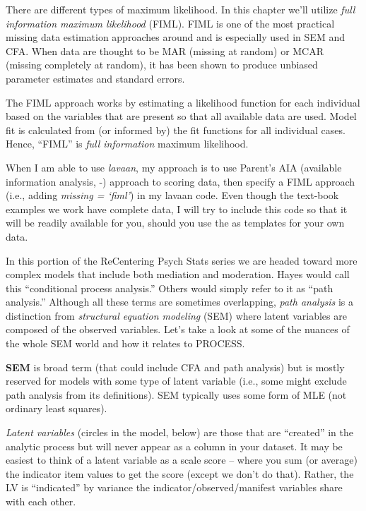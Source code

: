 \documentclass[
  11pt,
]{book}
\begin{document}
There are different types of maximum likelihood. In this chapter we'll utilize \emph{full information maximum likelihood} (FIML). FIML is one of the most practical missing data estimation approaches around and is especially used in SEM and CFA. When data are thought to be MAR (missing at random) or MCAR (missing completely at random), it has been shown to produce unbiased parameter estimates and standard errors.

The FIML approach works by estimating a likelihood function for each individual based on the variables that are present so that all available data are used. Model fit is calculated from (or informed by) the fit functions for all individual cases. Hence, ``FIML'' is \emph{full information} maximum likelihood.

When I am able to use \emph{lavaan}, my approach is to use Parent's AIA (available information analysis, -\citet{parent_handling_2013}) approach to scoring data, then specify a FIML approach (i.e., adding \emph{missing = `fiml'}) in my lavaan code. Even though the text-book examples we work have complete data, I will try to include this code so that it will be readily available for you, should you use the as templates for your own data.

In this portion of the ReCentering Psych Stats series we are headed toward more complex models that include both mediation and moderation. Hayes \citep{hayes_introduction_2018} would call this ``conditional process analysis.'' Others would simply refer to it as ``path analysis.'' Although all these terms are sometimes overlapping, \emph{path analysis} is a distinction from \emph{structural equation modeling} (SEM) where latent variables are composed of the observed variables. Let's take a look at some of the nuances of the whole SEM world and how it relates to PROCESS.

\textbf{SEM} is broad term (that could include CFA and path analysis) but is mostly reserved for models with some type of latent variable (i.e., some might exclude path analysis from its definitions). SEM typically uses some form of MLE (not ordinary least squares).

\emph{Latent variables} (circles in the model, below) are those that are ``created'' in the analytic process but will never appear as a column in your dataset. It may be easiest to think of a latent variable as a scale score -- where you sum (or average) the indicator item values to get the score (except we don't do that). Rather, the LV is ``indicated'' by variance the indicator/observed/manifest variables share with each other.
\end{document}

